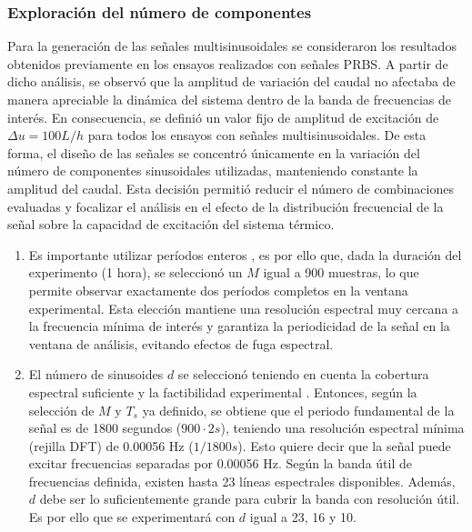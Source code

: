 \documentclass[11pt]{report}
\begin{document}
\subsubsection {Exploración del número de componentes}
Para la generación de las señales multisinusoidales se consideraron los resultados obtenidos previamente en los ensayos realizados con señales PRBS. A partir de dicho análisis, se observó que la amplitud de variación del caudal no afectaba de manera apreciable la dinámica del sistema dentro de la banda de frecuencias de interés. En consecuencia, se definió un valor fijo de amplitud de excitación de $\Delta u = 100 L/h$ para todos los ensayos con señales multisinusoidales. De esta forma, el diseño de las señales se concentró únicamente en la variación del número de componentes sinusoidales utilizadas, manteniendo constante la amplitud del caudal. Esta decisión permitió reducir el número de combinaciones evaluadas y focalizar el análisis en el efecto de la distribución frecuencial de la señal sobre la capacidad de excitación del sistema térmico.
\begin{enumerate}[label=\roman*)]
\item Es importante utilizar períodos enteros \cite{ljung1999system}, es por ello que, dada la duración del experimento (1 hora), se seleccionó un $M$ igual a 900 muestras, lo que permite observar exactamente dos períodos completos en la ventana experimental. Esta elección mantiene una resolución espectral muy cercana a la frecuencia mínima de interés y garantiza la periodicidad de la señal en la ventana de análisis, evitando efectos de fuga espectral.
\item El número de sinusoides $d$ se seleccionó teniendo en cuenta la cobertura espectral suficiente y la factibilidad experimental \cite{ljung1999system}. Entonces, según la selección de $M$ y $T_s$ ya definido, se obtiene que el periodo fundamental de la señal  es de 1800 segundos ($900\cdot2s$), teniendo una resolución espectral mínima (rejilla DFT) de 0.00056 Hz ($1/1800s$). Esto quiere decir que la señal puede excitar frecuencias separadas por 0.00056 Hz. Según la banda útil de frecuencias definida, existen hasta 23 líneas espectrales disponibles. Además, $d$ debe ser lo suficientemente grande para cubrir la banda con resolución útil. Es por ello que se experimentará con $d$ igual a 23, 16 y 10. 









\end{enumerate}
\end{document}

